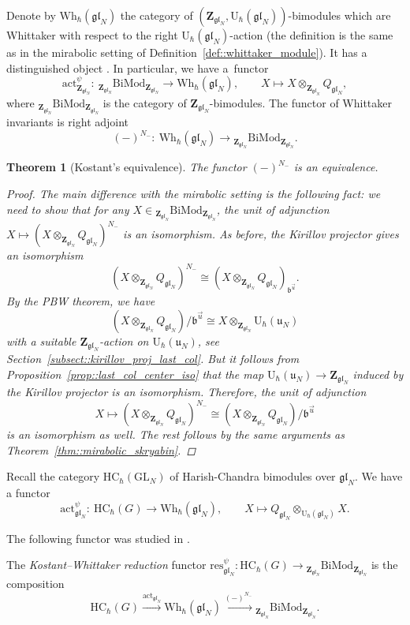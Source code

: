 \documentclass[pdftex]{sigma}
\numberwithin{equation}{section}
\newtheorem{Theorem}{Theorem}[section]
\newcommand{\U}{\mathrm{U}_{\hbar}}
\newcommand{\Z}{\mathbf{Z}}
\newcommand{\GL}{\mathrm{GL}}
\renewcommand{\b}{\mathfrak{b}}
\newcommand{\n}{\mathfrak{n}}
\renewcommand{\u}{\mathfrak{u}}
\newcommand{\Wh}{\mathrm{Wh}_{\hbar}}
\newcommand{\act}{\mathrm{act}}
\newcommand{\BiMod}[2]{{}_{#1}\mathrm{BiMod}_{#2}}
\newcommand{\HC}{\mathrm{HC}_{\hbar}}
\newcommand{\res}{\mathrm{res}}
\newcommand{\gl}{\mathfrak{gl}}
\begin{document}
	Denote by $\Wh(\gl_N)$ the category of $(\Z_{\gl_N},\U(\gl_N))$-bimodules which are Whittaker with respect to the right $\U(\gl_N)$-action (the definition is the same as in the mirabolic setting of Definition~\ref{def::whittaker_module}). It has a distinguished object \smash{$Q_{\gl_N} = \n_-^{\psi} \backslash \U(\gl_N)$}. In particular, we have a~functor
	\[
	\act_{\Z_{\gl_N}}^{\psi} \colon\ \BiMod{\Z_{\gl_N}}{\Z_{\gl_N}}\rightarrow \Wh(\gl_N), \qquad X \mapsto X \otimes_{\Z_{\gl_N}} Q_{\gl_N},
	\]
	where $\BiMod{\Z_{\gl_N}}{\Z_{\gl_N}}$ is the category of $\Z_{\gl_N}$-bimodules. The functor of Whittaker invariants is right adjoint
	\[
	(-)^{N_-} \colon\ \Wh(\gl_N) \rightarrow \BiMod{\Z_{\gl_N}}{\Z_{\gl_N}}.
	\]
	
	\begin{Theorem}[Kostant's equivalence]
		\label{thm::gl_skryabin}
		The functor $(-)^{N_-}$ is an equivalence.
		\begin{proof}
			The main difference with the mirabolic setting is the following fact: we need to show that for any $X \in \BiMod{\Z_{\gl_N}}{\Z_{\gl_N}}$, the unit of adjunction
$
			X \mapsto (X \otimes_{\Z_{\gl_N}} Q_{\gl_N})^{N_-}
$
			is an isomorphism. As before, the Kirillov projector gives an isomorphism
			\[
			(X \otimes_{\Z_{\gl_N}} Q_{\gl_N})^{N_-} \cong (X \otimes_{\Z_{\gl_N}} Q_{\gl_N})_{\b^{\vec{u}}}.
			\]
			By the PBW theorem, we have
			\[
			(X \otimes_{\Z_{\gl_N}} Q_{\gl_N})/\b^{\vec{u}} \cong X \otimes_{\Z_{\gl_N}} \U(\u_N)
			\]
			with a suitable $\Z_{\gl_N}$-action on $\U(\u_N)$, see Section~\ref{subsect::kirillov_proj_last_col}. But it follows from Proposition~\ref{prop::last_col_center_iso} that the map $\U(\u_N) \rightarrow \Z_{\gl_N}$ induced by the Kirillov projector is an isomorphism. Therefore, the unit of adjunction
			\[
			X \mapsto (X \otimes_{\Z_{\gl_N}} Q_{\gl_N})^{N_-} \cong (X \otimes_{\Z_{\gl_N}} Q_{\gl_N})/\b^{\vec{u}}
			\]
			is an isomorphism as well. The rest follows by the same arguments as Theorem~\ref{thm::mirabolic_skryabin}.
		\end{proof}
	\end{Theorem}
	
	Recall the category $\HC(\GL_N)$ of Harish-Chandra bimodules over $\gl_N$. We have a functor
	\[
	\act_{\gl_N}^{\psi}\colon\ \HC(G) \rightarrow \Wh(\gl_N), \qquad X \mapsto Q_{\gl_N} \otimes_{\U(\gl_N)} X.
	\]
	
	The following functor was studied in \cite{BezrukavnikovFinkelberg}.
	\begin{Definition}
		The \emph{Kostant--Whittaker reduction} functor $\res_{\gl_N}^{\psi} \colon \HC(G) \rightarrow \BiMod{\Z_{\gl_N}}{\Z_{\gl_N}}$ is the composition
		\[
		\HC(G) \xrightarrow{\act_{\gl_N}} \Wh(\gl_N) \xrightarrow{(-)^{N_-}} \BiMod{\Z_{\gl_N}}{\Z_{\gl_N}}.
		\]
	\end{Definition}
	
\end{document}
